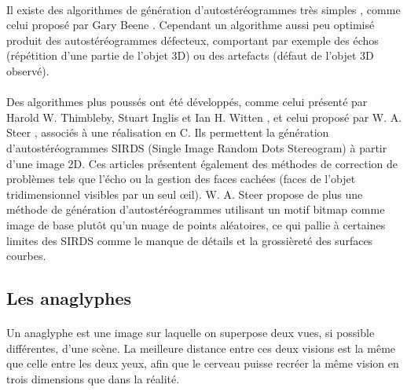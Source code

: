 \paragraph{}
Il existe des algorithmes de génération d’autostéréogrammes très simples , comme celui proposé par Gary Beene \cite{garybeene}. Cependant un algorithme aussi peu optimisé produit des autostéréogrammes défecteux, comportant par exemple des échos (répétition d'une partie de l'objet 3D) ou des artefacts (défaut de l'objet 3D observé).

\paragraph{}
Des algorithmes plus poussés ont été développés, comme celui présenté par Harold W. Thimbleby, Stuart Inglis et Ian H. Witten \cite{stereogram}, et celui proposé par W. A. Steer \cite{wasteer}, associés à une réalisation en C. Ils permettent la génération d’autostéréogrammes SIRDS (Single Image Random Dots Stereogram) à partir d’une image 2D. Ces articles présentent également des méthodes de correction de problèmes tels que l'écho ou la gestion des faces cachées (faces de l'objet tridimensionnel visibles par un seul œil). W. A. Steer propose de plus une méthode de génération d'autostéréogrammes utilisant un motif bitmap comme image de base plutôt qu'un nuage de points aléatoires, ce qui pallie à certaines limites des SIRDS comme le manque de détails et la grossièreté des surfaces courbes.


\subsection{Les anaglyphes}

\paragraph{}
	Un anaglyphe est une image sur laquelle on superpose deux vues, si possible différentes, d’une scène. La meilleure distance entre ces deux visions est la même que celle entre les deux yeux, afin que le cerveau puisse recréer la même vision en trois dimensions que dans la réalité.
	
